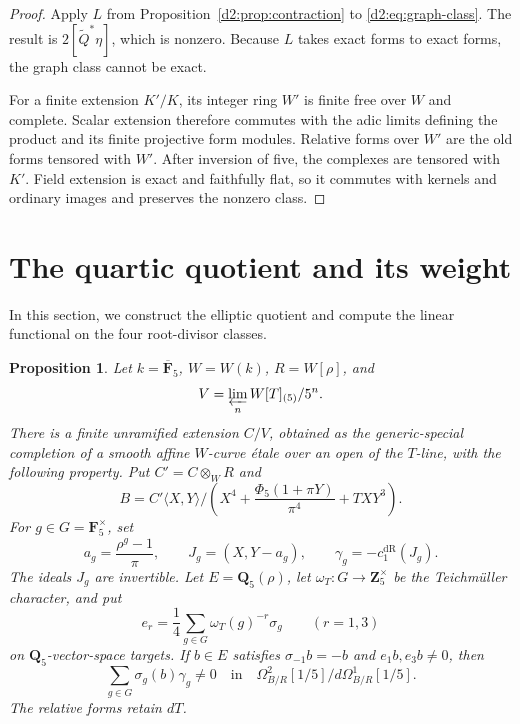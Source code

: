 \documentclass[11pt,a4paper]{amsart}
\numberwithin{equation}{section}
\newtheorem{proposition}[theorem]{Proposition}
\theoremstyle{definition}
\theoremstyle{remark}
\newcommand{\DtwoZZ}{\mathbf{Z}}
\newcommand{\DtwoQQ}{\mathbf{Q}}
\newcommand{\DtwoFF}{\mathbf{F}}
\newcommand{\Dtwowt}{\widetilde}
\newcommand{\DtwodR}{\mathrm{dR}}
\begin{document}
\begin{proof}
Apply \(L\) from Proposition~\ref{d2:prop:contraction} to
\eqref{d2:eq:graph-class}.
The result is \(2[\Dtwowt Q^*\eta]\), which is nonzero.
Because \(L\) takes exact forms to exact forms, the graph class
cannot be exact.

For a finite extension \(K'/K\), its integer ring \(W'\) is finite
free over \(W\) and complete.
Scalar extension therefore commutes with the adic limits defining
the product and its finite projective form modules.
Relative forms over \(W'\) are the old forms tensored with \(W'\).
After inversion of five, the complexes are tensored with \(K'\).
Field extension is exact and faithfully flat, so it commutes with
kernels and ordinary images and preserves the nonzero class.
\end{proof}

\section{The quartic quotient and its weight}\label{d2:sec:quartic}

In this section, we construct the elliptic quotient and compute the
linear functional on the four root-divisor classes.

\begin{proposition}\label{d2:prop:weighted}
Let \(k=\overline{\DtwoFF}_5\), \(W=W(k)\), \(R=W[\rho]\), and
\[
 V=\varprojlim_n W[T]_{(5)}/5^n.
\]
There is a finite unramified extension \(C/V\), obtained as the
generic-special completion of a smooth affine \(W\)-curve \'etale
over an open of the \(T\)-line, with the following property.
Put \(C'=C\otimes_WR\) and
\[
 B=C'\langle X,Y\rangle/
 \left(X^4+\frac{\Phi_5(1+\pi Y)}{\pi^4}+TXY^3\right).
\]
For \(g\in G=\DtwoFF_5^\times\), set
\[
 a_g=\frac{\rho^g-1}{\pi},\qquad
 J_g=(X,Y-a_g),\qquad
 \gamma_g=-c_1^\DtwodR(J_g).
\]
The ideals \(J_g\) are invertible.
Let \(E=\DtwoQQ_5(\rho)\), let
\(\omega_T\colon G\to\DtwoZZ_5^\times\) be the Teichm\"uller character,
and put
\[
 e_r=\frac14\sum_{g\in G}\omega_T(g)^{-r}\sigma_g
 \qquad(r=1,3)
\]
on \(\DtwoQQ_5\)-vector-space targets.
If \(b\in E\) satisfies
\(\sigma_{-1}b=-b\) and \(e_1b,e_3b\ne0\), then
\[
 \sum_{g\in G}\sigma_g(b)\gamma_g\ne0
 \quad\text{in}\quad
 \Omega^2_{B/R}[1/5]\big/d\Omega^1_{B/R}[1/5].
\]
The relative forms retain \(dT\).
\end{proposition}
\end{document}
